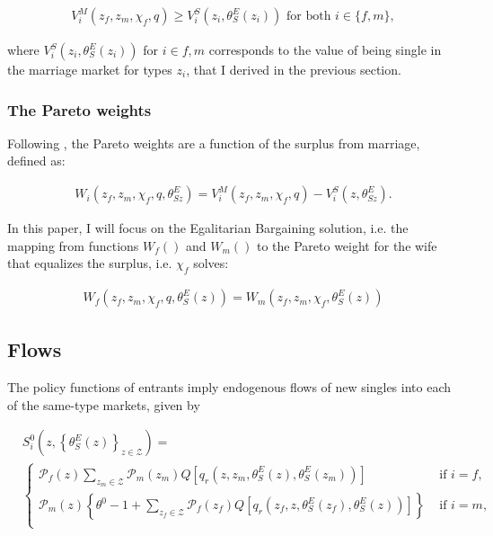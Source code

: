 \documentclass[12pt]{article}
\begin{document}
\begin{align*}
	V_i^M\left(z_f,z_m,\chi_f,q\right)\geq V_i^S\left(z_i,\theta_{S}^E(z_i)\right) \text{ for both } i\in\{f,m\},
\end{align*}  

where $V_i^S\left(z_i,\theta_{S}^E(z_i)\right)$ for $i\in{f,m}$ corresponds to the value of being single in the marriage market for types $z_i$, that I derived in the previous section.

\subsubsection{The Pareto weights}

Following \citet{knowles13}, the Pareto weights are a function of the surplus from marriage, defined as:

\begin{align*}
	W_i\left(z_f,z_m,\chi_f,q,\theta_{Sz}^E\right) = V_i^M\left(z_f,z_m,\chi_f,q\right)-V_i^S\left(z,\theta_{Sz}^E\right).
\end{align*} 
 
In this paper, I will focus on the Egalitarian Bargaining solution, i.e. the mapping from functions $W_f\left(\right)$ and $W_m\left(\right)$ to the Pareto weight for the wife that equalizes the surplus, i.e. $\chi_f$ solves:

\begin{align*}
	W_f\left(z_f,z_m,\chi_f,q,\theta_{S}^E(z)\right) = W_m\left(z_f,z_m,\chi_f,\theta_{S}^E(z)\right)
\end{align*}   

\subsection{Flows}

The policy functions of entrants imply endogenous flows of new singles into each of the same-type markets, given by

\begin{align*}
& S_{i}^0\left(z,\left\lbrace \theta_{S}^E(z) \right\rbrace_{z\in\mathcal{Z}}\right) = \\ &
\begin{cases}
\mathcal{P}_f\left(z\right)\sum_{z_m\in\mathcal{Z}} \mathcal{P}_m(z_m)Q\left[q_r\left(z,z_m,\theta_{S}^E(z),\theta_{S}^E(z_m)\right)\right] & \text{ if } i=f,  \\
\mathcal{P}_m\left(z\right)\left\lbrace \theta^0-1+\sum_{z_f\in\mathcal{Z}} \mathcal{P}_f(z_f)Q\left[q_r\left(z_f,z,\theta_{S}^E(z_f),\theta_{S}^E(z)\right)\right]\right\rbrace & \text{ if } i=m, \\
\end{cases}	
\end{align*}
\end{document}
